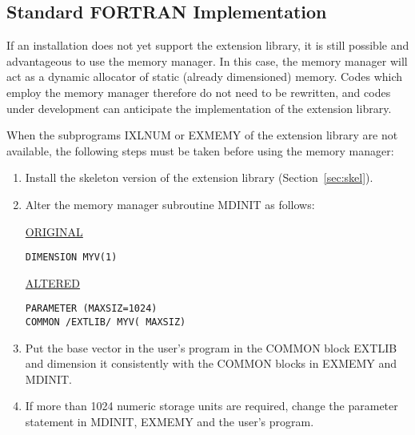 \subsection{Standard FORTRAN Implementation}

If an installation does not yet support the extension library, it is still
possible and advantageous to use the memory manager.  In this case, the
memory manager will act as a dynamic allocator of static (already
dimensioned) memory.  Codes which employ the memory manager therefore do not
need to be rewritten, and codes under development can anticipate the
implementation of the extension library.

When the subprograms IXLNUM or EXMEMY of the extension library are not
available, the following steps must be taken before using the memory
manager:
\begin{enumerate}
\item Install the skeleton version of the extension library
(Section~\ref{sec:skel}).

\item Alter the memory manager subroutine MDINIT as follows:

\underline{ORIGINAL}

\verb+DIMENSION MYV(1)+

\underline{ALTERED}
\begin{verbatim}
PARAMETER (MAXSIZ=1024)
COMMON /EXTLIB/ MYV( MAXSIZ)
\end{verbatim}

\item Put the base vector in the user's program in the COMMON block
          EXTLIB and dimension it consistently with the COMMON blocks in
          EXMEMY and MDINIT.

\item If more than 1024 numeric storage units are required, change the
          parameter statement in MDINIT, EXMEMY and the user's program.
\end{enumerate}

